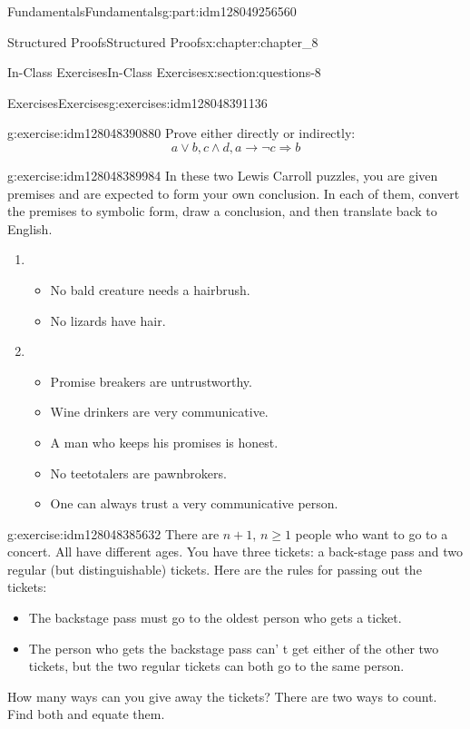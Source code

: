 \documentclass[oneside,10pt,]{book}
\numberwithin{equation}{section}
\begin{document}
\begin{partptx}{Fundamentals}{}{Fundamentals}{}{}{g:part:idm128049256560}
\begin{chapterptx}{Structured Proofs}{}{Structured Proofs}{}{}{x:chapter:chapter_8}
\begin{sectionptx}{In-Class Exercises}{}{In-Class Exercises}{}{}{x:section:questions-8}
\begin{exercises-subsection}{Exercises}{}{Exercises}{}{}{g:exercises:idm128048391136}
\begin{exercisegroup}
\begin{divisionexerciseeg}{1}{}{}{g:exercise:idm128048390880}
Prove either directly or indirectly:%
\begin{equation*}
a \lor  b, c \land  d, a \rightarrow  \neg c \Rightarrow  b
\end{equation*}
%
\end{divisionexerciseeg}%
\begin{divisionexerciseeg}{2}{}{}{g:exercise:idm128048389984}%
In these two Lewis Carroll puzzles, you are given premises and are expected to form your own conclusion.  In each of them, convert the premises to symbolic form, draw a conclusion, and then translate back to English.%
\begin{enumerate}[label=(\alph*)]
\item{}%
\begin{itemize}[label=\textbullet]
\item{}No bald creature needs a hairbrush.%
\item{}No lizards have hair.%
\end{itemize}
%
\item{}%
\begin{itemize}[label=\textbullet]
\item{}Promise breakers are untrustworthy.%
\item{}Wine drinkers are very communicative.%
\item{}A man who keeps his promises is honest.%
\item{}No teetotalers are pawnbrokers.%
\item{}One can always trust a very communicative person.%
\end{itemize}
%
\end{enumerate}
%
\end{divisionexerciseeg}%
\begin{divisionexerciseeg}{3}{}{}{g:exercise:idm128048385632}%
There are \(n+1\), \(n\ge 1\) people who want to go to a concert.  All have different ages. You have three tickets: a back-stage pass and two regular (but distinguishable) tickets. Here are the rules for passing out the tickets:%
\begin{itemize}[label=\textbullet]
\item{}The backstage pass must go to the oldest person who gets a ticket.%
\item{}The person who gets the backstage pass can' t get either of the other two tickets, but the two regular tickets can both go to the same person.%
\end{itemize}
How many ways can you give away the tickets? There are two ways to count. Find both and equate them.%

\end{divisionexerciseeg}
\end{exercisegroup}
\end{exercises-subsection}
\end{sectionptx}
\end{chapterptx}
\end{partptx}
\end{document}
